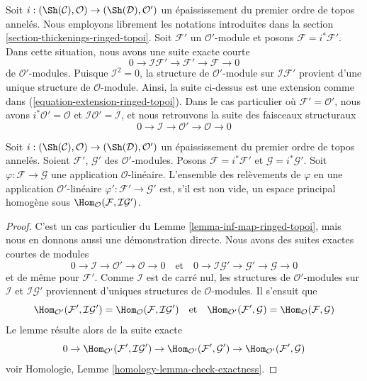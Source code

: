 \noindent
Soit $i : (\Sh(\mathcal{C}), \mathcal{O}) \to (\Sh(\mathcal{D}), \mathcal{O}')$
un épaississement du premier ordre de topos annelés. Nous employons librement
les notations introduites dans la
section \ref{section-thickenings-ringed-topoi}.
Soit $\mathcal{F}'$ un $\mathcal{O}'$-module et posons
$\mathcal{F} = i^*\mathcal{F}'$.
Dans cette situation, nous avons une suite exacte courte
$$
0 \to \mathcal{I}\mathcal{F}' \to \mathcal{F}' \to \mathcal{F} \to 0
$$
de $\mathcal{O}'$-modules. Puisque $\mathcal{I}^2 = 0$, la structure de
$\mathcal{O}'$-module sur $\mathcal{I}\mathcal{F}'$ provient d'une unique
structure de $\mathcal{O}$-module.
Ainsi, la suite ci-dessus est une extension comme dans
(\ref{equation-extension-ringed-topoi}).
Dans le cas particulier où $\mathcal{F}' = \mathcal{O}'$, nous avons
$i^*\mathcal{O}' = \mathcal{O}$ et
$\mathcal{I}\mathcal{O}' = \mathcal{I}$, et nous retrouvons la suite des
faisceaux structuraux
$$
0 \to \mathcal{I} \to \mathcal{O}' \to \mathcal{O} \to 0
$$

\begin{lemma}
\label{lemma-inf-map-special-ringed-topoi}
Soit $i : (\Sh(\mathcal{C}), \mathcal{O}) \to (\Sh(\mathcal{D}), \mathcal{O}')$
un épaississement du premier ordre de topos annelés.
Soient $\mathcal{F}'$, $\mathcal{G}'$ des $\mathcal{O}'$-modules.
Posons $\mathcal{F} = i^*\mathcal{F}'$ et
$\mathcal{G} = i^*\mathcal{G}'$.
Soit $\varphi : \mathcal{F} \to \mathcal{G}$ une application
$\mathcal{O}$-linéaire.
L'ensemble des relèvements de $\varphi$ en une application
$\mathcal{O}'$-linéaire $\varphi' : \mathcal{F}' \to \mathcal{G}'$ est, s'il
est non vide, un espace principal homogène sous
$\Hom_\mathcal{O}(\mathcal{F}, \mathcal{I}\mathcal{G}')$.
\end{lemma}

\begin{proof}
C'est un cas particulier du Lemme \ref{lemma-inf-map-ringed-topoi}, mais nous
en donnons aussi une démonstration directe. Nous avons des suites exactes
courtes de modules
$$
0 \to \mathcal{I} \to \mathcal{O}' \to \mathcal{O} \to 0
\quad\text{et}\quad
0 \to \mathcal{I}\mathcal{G}' \to \mathcal{G}' \to \mathcal{G} \to 0
$$
et de même pour $\mathcal{F}'$.
Comme $\mathcal{I}$ est de carré nul, les structures de $\mathcal{O}'$-modules
sur $\mathcal{I}$ et $\mathcal{I}\mathcal{G}'$ proviennent d'uniques structures
de $\mathcal{O}$-modules. Il s'ensuit que
$$
\Hom_{\mathcal{O}'}(\mathcal{F}', \mathcal{I}\mathcal{G}') =
\Hom_\mathcal{O}(\mathcal{F}, \mathcal{I}\mathcal{G}')
\quad\text{et}\quad
\Hom_{\mathcal{O}'}(\mathcal{F}', \mathcal{G}) =
\Hom_\mathcal{O}(\mathcal{F}, \mathcal{G})
$$
Le lemme résulte alors de la suite exacte
$$
0 \to \Hom_{\mathcal{O}'}(\mathcal{F}', \mathcal{I}\mathcal{G}') \to
\Hom_{\mathcal{O}'}(\mathcal{F}', \mathcal{G}') \to
\Hom_{\mathcal{O}'}(\mathcal{F}', \mathcal{G})
$$
voir Homologie, Lemme \ref{homology-lemma-check-exactness}.
\end{proof}

